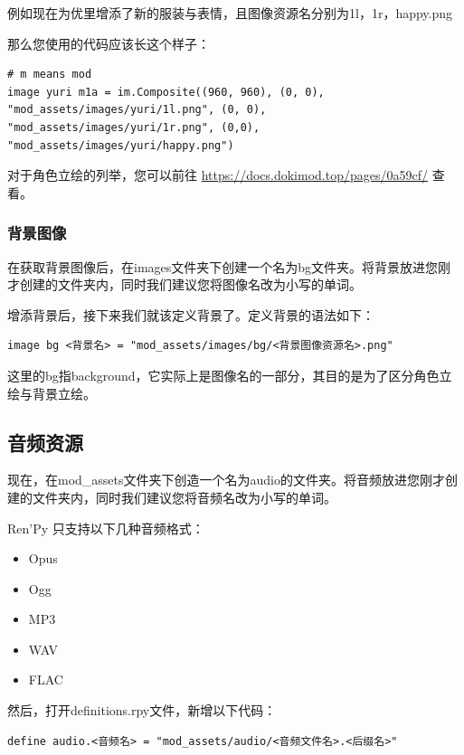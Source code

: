 \documentclass[../../Main.tex]{subfiles}
\begin{document}
例如现在为优里增添了新的服装与表情，且图像资源名分别为1l，1r，happy.png

那么您使用的代码应该长这个样子：
\begin{lstlisting}
# m means mod
image yuri m1a = im.Composite((960, 960), (0, 0), "mod_assets/images/yuri/1l.png", (0, 0), "mod_assets/images/yuri/1r.png", (0,0), "mod_assets/images/yuri/happy.png")
\end{lstlisting}


对于角色立绘的列举，您可以前往 \url{https://docs.dokimod.top/pages/0a59cf/} 查看。

\subsubsection{背景图像}
在获取背景图像后，在images文件夹下创建一个名为bg文件夹。将背景放进您刚才创建的文件夹内，同时我们建议您将图像名改为小写的单词。

增添背景后，接下来我们就该定义背景了。定义背景的语法如下：

\begin{lstlisting}
image bg <背景名> = "mod_assets/images/bg/<背景图像资源名>.png"
\end{lstlisting}

\begin{ExtraKnowledge}
    这里的bg指background，它实际上是图像名的一部分，其目的是为了区分角色立绘与背景立绘。
\end{ExtraKnowledge}

\subsection{音频资源}
现在，在mod\_assets文件夹下创造一个名为audio的文件夹。将音频放进您刚才创建的文件夹内，同时我们建议您将音频名改为小写的单词。

Ren'Py 只支持以下几种音频格式：
\begin{itemize}
    \item Opus
    \item Ogg
    \item MP3
    \item WAV
    \item FLAC
\end{itemize}

然后，打开definitions.rpy文件，新增以下代码：
\begin{lstlisting}
define audio.<音频名> = "mod_assets/audio/<音频文件名>.<后缀名>"
\end{lstlisting}
\end{document}
